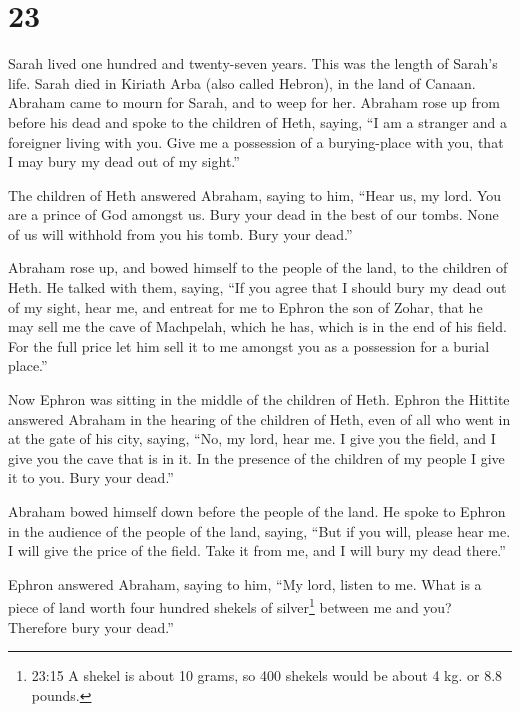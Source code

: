 \hypertarget{section-22}{%
\section{23}\label{section-22}}

 Sarah lived one hundred and twenty-seven years. This was
the length of Sarah's life.  Sarah died in Kiriath Arba
(also called Hebron), in the land of Canaan. Abraham came to mourn for
Sarah, and to weep for her.  Abraham rose up from before his
dead and spoke to the children of Heth, saying,  ``I am a
stranger and a foreigner living with you. Give me a possession of a
burying-place with you, that I may bury my dead out of my sight.''

 The children of Heth answered Abraham, saying to him,
 ``Hear us, my lord. You are a prince of God amongst us.
Bury your dead in the best of our tombs. None of us will withhold from
you his tomb. Bury your dead.''

 Abraham rose up, and bowed himself to the people of the
land, to the children of Heth.  He talked with them, saying,
``If you agree that I should bury my dead out of my sight, hear me, and
entreat for me to Ephron the son of Zohar,  that he may sell
me the cave of Machpelah, which he has, which is in the end of his
field. For the full price let him sell it to me amongst you as a
possession for a burial place.''

 Now Ephron was sitting in the middle of the children of
Heth. Ephron the Hittite answered Abraham in the hearing of the children
of Heth, even of all who went in at the gate of his city, saying,
 ``No, my lord, hear me. I give you the field, and I give
you the cave that is in it. In the presence of the children of my people
I give it to you. Bury your dead.''

 Abraham bowed himself down before the people of the land.
 He spoke to Ephron in the audience of the people of the
land, saying, ``But if you will, please hear me. I will give the price
of the field. Take it from me, and I will bury my dead there.''

 Ephron answered Abraham, saying to him,  ``My
lord, listen to me. What is a piece of land worth four hundred shekels
of silver\footnote{23:15 A shekel is about 10 grams, so 400 shekels
  would be about 4 kg. or 8.8 pounds.} between me and you? Therefore
bury your dead.''

